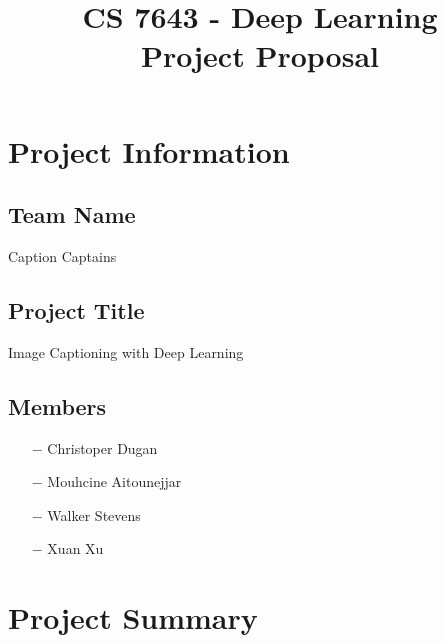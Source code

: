 \documentclass[10pt,twocolumn,letterpaper]{article}
\begin{document}
\title{
CS 7643 - Deep Learning \\
Project Proposal \\
}

\maketitle

\section{Project Information}

\subsection{Team Name}

Caption Captains

\subsection{Project Title}

Image Captioning with Deep Learning

\subsection{Members}

\begin{itemize}
	\setlength\itemsep{0em}
    \item[$-$] Christoper Dugan
    \item[$-$] Mouhcine Aitounejjar
    \item[$-$] Walker Stevens
    \item[$-$] Xuan Xu
\end{itemize}

\section{Project Summary}
\end{document}
